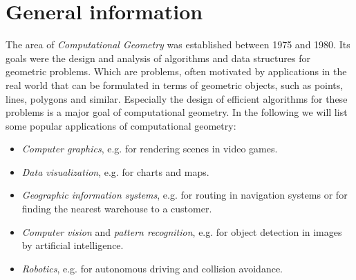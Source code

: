 \section{General information}
    The area of \emph{Computational Geometry} was established between 1975 and 1980. Its goals were the design and analysis of algorithms and data structures for geometric problems. Which are problems, often motivated by applications in the real world that can be formulated in terms of geometric objects, such as points, lines, polygons and similar. Especially the design of efficient algorithms for these problems is a major goal of computational geometry. In the following we will list some popular applications of computational geometry: 
    \begin{itemize}[itemsep=-3pt]
        \item \emph{Computer graphics}, e.g. for rendering scenes in video games.
        \item \emph{Data visualization}, e.g. for charts and maps.
        \item \emph{Geographic information systems}, e.g. for routing in navigation systems or for finding the nearest warehouse to a customer.
        \item \emph{Computer vision} and \emph{pattern recognition}, e.g. for object detection in images by artificial intelligence.
        \item \emph{Robotics}, e.g. for autonomous driving and collision avoidance.
    \end{itemize}

